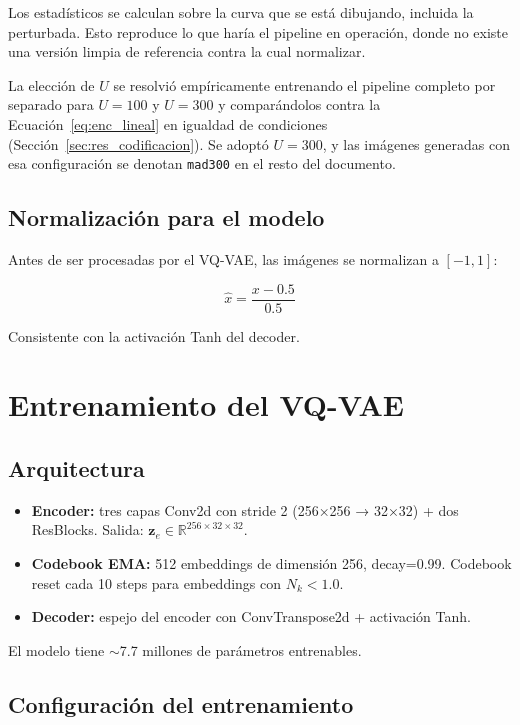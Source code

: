 Los estadísticos se calculan sobre la curva que se está dibujando, incluida la perturbada. Esto reproduce lo que haría el pipeline en operación, donde no existe una versión limpia de referencia contra la cual normalizar.

La elección de $U$ se resolvió empíricamente entrenando el pipeline completo por separado para $U = 100$ y $U = 300$ y comparándolos contra la Ecuación~\ref{eq:enc_lineal} en igualdad de condiciones (Sección~\ref{sec:res_codificacion}). Se adoptó $U = 300$, y las imágenes generadas con esa configuración se denotan \texttt{mad300} en el resto del documento.

\subsection{Normalización para el modelo}

Antes de ser procesadas por el VQ-VAE, las imágenes se normalizan a $[-1, 1]$:

\begin{equation}
\hat{x} = \frac{x - 0.5}{0.5}
\end{equation}

Consistente con la activación Tanh del decoder.

\section{Entrenamiento del VQ-VAE}

\subsection{Arquitectura}

\begin{itemize}
    \item \textbf{Encoder:} tres capas Conv2d con stride 2 (256×256 → 32×32) + dos ResBlocks. Salida: $\mathbf{z}_e \in \mathbb{R}^{256 \times 32 \times 32}$.
    \item \textbf{Codebook EMA:} 512 embeddings de dimensión 256, decay=0.99. Codebook reset cada 10 steps para embeddings con $N_k < 1.0$.
    \item \textbf{Decoder:} espejo del encoder con ConvTranspose2d + activación Tanh.
\end{itemize}

El modelo tiene $\sim$7.7 millones de parámetros entrenables.

\subsection{Configuración del entrenamiento}


